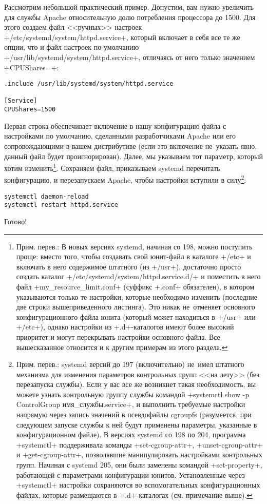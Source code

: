\documentclass[10pt,oneside,a4paper]{article}
\begin{document}
Рассмотрим небольшой практический пример. Допустим, вам нужно увеличить
для службы Apache относительную долю потребления процессора до 1500. Для этого
создаем файл <<ручных>> настроек +/etc/systemd/system/httpd.service+, который
включает в себя все те же опции, что и файл настроек по умолчанию
+/usr/lib/systemd/system/httpd.service+, отличаясь от него только значением
+CPUShares=+:
\begin{Verbatim}
.include /usr/lib/systemd/system/httpd.service

[Service]
CPUShares=1500
\end{Verbatim}
Первая строка обеспечивает включение в нашу конфигурацию файла с настройками по
умолчанию, сделанными разработчиками Apache или его сопровождающими в вашем
дистрибутиве (если это включение не~указать явно, данный файл будет
проигнорирован).  Далее, мы указываем тот параметр, который хотим
изменить\footnote{Прим. перев.: В новых версиях systemd, начиная со 198, можно
поступить проще: вместо того, чтобы создавать свой юнит-файл в каталоге +/etc+ и
включать в него содержимое штатного (из +/usr+), достаточно просто создать
каталог +/etc/systemd/system/httpd.service.d/+ и поместить в него файл
+my_resource_limit.conf+ (суффикс +.conf+ обязателен), в котором указываются
только те настройки, которые необходимо изменить (последние две строки
вышеприведенного листинга). Это никак не~отменяет основного конфигурационного
файла юнита (который может находиться в +/usr+ или +/etc+), однако настройки из
+.d+-каталогов имеют более высокий приоритет и могут перекрывать настройки
основного файла. Все вышесказанное относится и к другим примерам из этого
раздела.}. Сохраняем файл, приказываем systemd перечитать конфигурацию, и
перезапускаем Apache, чтобы настройки вступили в силу\footnote{Прим. перев.:
systemd версий до 197 (включительно) не~имел штатного механизма для изменения
параметров контрольных групп <<на лету>> (без перезапуска службы). Если у вас
все же возникнет такая необходимость, вы можете узнать контрольную группу службы
командой +systemctl show -p ControlGroup имя_службы.service+, и выполнить
требуемые настройки напрямую через запись значений в псевдофайлы cgroupfs
(разумеется, при следующем запуске службы к ней будут применены параметры,
указанные в конфигурационном файле). В версиях systemd со 198 по 204, 
программа +systemctl+ поддерживала команды +set-cgroup-attr+,
+unset-cgroup-attr+ и +get-cgroup-attr+, позволявшие манипулировать настройками
контрольных групп. Начиная с systemd 205, они были заменены командой
+set-property+, работающей с параметрами конфигурации юнитов. Установленные
через +systemctl+ настройки сохраняются во вспомогательных конфигурационных
файлах, которые размещаются в +.d+-каталогах (см. примечание выше).}:
\begin{Verbatim}
systemctl daemon-reload
systemctl restart httpd.service
\end{Verbatim}
Готово!
\end{document}
